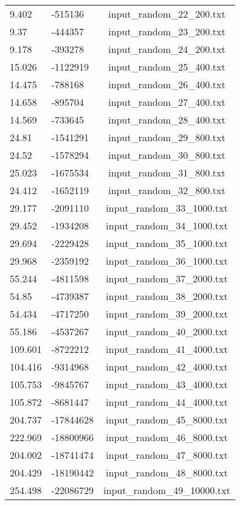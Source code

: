 \begin{longtable}[hb]{|l|l|c|}
    9.402 & -515136 & input\_random\_22\_200.txt \\
    9.37 & -444357 & input\_random\_23\_200.txt \\
    9.178 & -393278 & input\_random\_24\_200.txt \\
    15.026 & -1122919 & input\_random\_25\_400.txt \\
    14.475 & -788168 & input\_random\_26\_400.txt \\
    14.658 & -895704 & input\_random\_27\_400.txt \\
    14.569 & -733645 & input\_random\_28\_400.txt \\
    24.81 & -1541291 & input\_random\_29\_800.txt \\
    24.52 & -1578294 & input\_random\_30\_800.txt \\
    25.023 & -1675534 & input\_random\_31\_800.txt \\
    24.412 & -1652119 & input\_random\_32\_800.txt \\
    29.177 & -2091110 & input\_random\_33\_1000.txt \\
    29.452 & -1934208 & input\_random\_34\_1000.txt \\
    29.694 & -2229428 & input\_random\_35\_1000.txt \\
    29.968 & -2359192 & input\_random\_36\_1000.txt \\
    55.244 & -4811598 & input\_random\_37\_2000.txt \\
    54.85 & -4739387 & input\_random\_38\_2000.txt \\
    54.434 & -4717250 & input\_random\_39\_2000.txt \\
    55.186 & -4537267 & input\_random\_40\_2000.txt \\
    109.601 & -8722212 & input\_random\_41\_4000.txt \\
    104.416 & -9314968 & input\_random\_42\_4000.txt \\
    105.753 & -9845767 & input\_random\_43\_4000.txt \\
    105.872 & -8681447 & input\_random\_44\_4000.txt \\
    204.737 & -17844628 & input\_random\_45\_8000.txt \\
    222.969 & -18800966 & input\_random\_46\_8000.txt \\
    204.002 & -18741474 & input\_random\_47\_8000.txt \\
    204.429 & -18190442 & input\_random\_48\_8000.txt \\
    254.498 & -22086729 & input\_random\_49\_10000.txt \\

\end{longtable}
